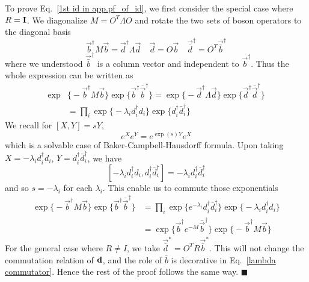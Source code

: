 To prove Eq.~\eqref{1st id in app.pf_of_id}, we first consider the special case where $R={\bf I}$. We diagonalize $M = O^{T} \Lambda O $ and rotate the two sets of boson operators to the diagonal basis
\begin{equation}
  \vec{b}^{\dagger}  M \vec{b} = \vec{d}^{\dagger} \Lambda \vec{d}  \quad \vec{d} = O \vec{b} \quad \vec{\bar{d}}^\dagger = O^T \vec{\bar{b}}^\dagger
\end{equation}
where we understood $\vec{\bar{b}}^\dagger$ is a column vector and independent to $\vec{{b}}^\dagger$. Thus the whole expression can be written as
\begin{equation}
\begin{aligned}
  \exp&\Big\{- \vec{b}^{\dagger} M \vec{b}  \Big\} \exp \Big\{ \vec{b}^{\dagger} \bar{\vec{b}}^\dagger  \Big\}  =  
  \exp\Big\{- \vec{d}^{\dagger} \Lambda \vec{d}  \Big\} \exp \Big\{   \vec{d}^{\dagger} \bar{\vec{d}}^\dagger  \Big\} \\
& = \prod_i  \exp\Big\{- \lambda_i d_i^{\dagger} d_i  \Big\} \exp \Big\{  d_i^{\dagger} \bar{d}_i ^{\dagger}  \Big\}
\end{aligned}
\end{equation}
We recall for $ [X, Y] = sY $, 
\begin{equation}
  e^X e^{Y} = e^{\exp (s ) Y} e^{X}
\end{equation}
which is a solvable case of Baker-Campbell-Hausdorff formula. Upon taking $X = -\lambda_i d_i^{\dagger} d_i$, $Y = d_i^{\dagger} \bar{d}^{\dagger}_i$, we have
\begin{equation}
\label{lambda commutator}
[- \lambda_i d_i^{\dagger} d_i, d_i ^{\dagger} \bar{d}_i^{\dagger}] =  - \lambda_i  d_i ^{\dagger} \bar{d}_i^{\dagger} 
\end{equation}
and so $s = - \lambda_i$ for each $\lambda_i$. This enable us to commute those exponentials
\begin{equation}
\begin{aligned}
 \exp\Big\{- \vec{b}^{\dagger} M \vec{b}  \Big\} \exp \Big\{  \vec{b}^{\dagger} \bar{\vec{b}}^\dagger  \Big\}   &= \prod_i \exp \Big\{ e^{- \lambda_i }  d^{\dagger}_i \bar{d}^{\dagger}_i  \Big\}  \exp \Big\{-\lambda_i  d^{\dagger}_i d_i  \Big\} \\
 & = \exp \Big\{ \vec{b}^{\dagger} e^{-M}  \bar{\vec{b}}^\dagger  \Big\} \exp\Big\{- \vec{b}^{\dagger} M \vec{b}  \Big\} 
\end{aligned}
\end{equation}
For the general case where $R \ne I$, we take $\vec{\bar{d}}^* = O^T R \vec{\bar{b}}^*$. This will not change the commutation relation of ${\bf d}$, and the role of $\bar{b}$ is decorative in Eq.~\eqref{lambda commutator}. Hence the rest of the proof follows the same way. \hfill$\blacksquare$

